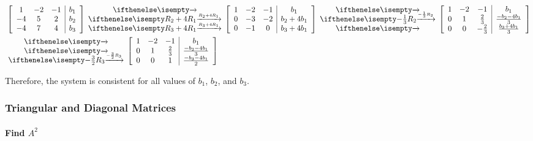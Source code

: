 \documentclass[
  letterpaper,
  DIV=11,
  numbers=noendperiod]{scrartcl}
\let\oldparagraph\paragraph
\renewcommand{\paragraph}[1]{\oldparagraph{#1}\mbox{}}
\begin{document}
\begin{align*}
&\left[\begin{array}{ccc|c}1 & -2 & -1 & b_1 \\ -4 & 5 & 2 & b_2 \\ -4 & 7 & 4 & b_3 \end{array}\right] \rowops{,R_2+4R_1,R_3+4R_1}\left[\begin{array}{ccc|c}1 & -2 & -1 & b_1 \\ 0 & -3 & -2 & b_2+4b_1 \\ 0 & -1 & 0 & b_3+4b_1\end{array}\right] \rowops{,-\frac{1}{3}R_2,}\left[\begin{array}{ccc|c}1 & -2 & -1 & b_1 \\ 0 & 1 & \frac{2}{3} & \frac{-b_2-4b_1}{3} \\ 0 & 0 & -\frac{2}{3} & \frac{b_3+4b_1}{3}\end{array}\right]\\
&\rowops{,,-\frac{3}{2}R_3}\left[\begin{array}{ccc|c}1 & -2 & -1 & b_1 \\ 0 & 1 & \frac{2}{3} & \frac{-b_2-4b_1}{3} \\ 0 & 0 & 1 & \frac{-b_3-4b_1}{2}\end{array}\right]
\end{align*}

Therefore, the system is consistent for all values of \(b_1\), \(b_2\),
and \(b_3\).

\newpage{}

\subsubsection{Triangular and Diagonal
Matrices}\label{triangular-and-diagonal-matrices}

\paragraph{\texorpdfstring{Find \(A^2\)}{Find A\^{}2}}\label{find-a2}
\end{document}
